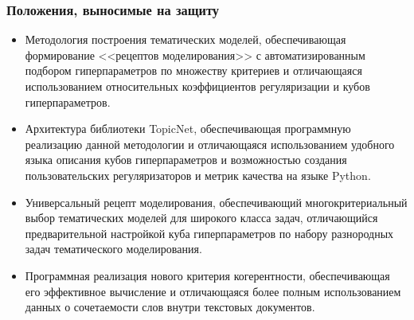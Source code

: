 \begin{frame}
    \frametitle{Положения, выносимые на защиту}
\small
    \begin{itemize}
\item
    Методология построения тематических моделей, обеспечивающая формирование <<рецептов моделирования>> с автоматизированным подбором гиперпараметров по множеству критериев и отличающаяся использованием относительных коэффициентов регуляризации и кубов гиперпараметров.
\item
    Архитектура библиотеки TopicNet, обеспечивающая программную реализацию данной методологии и отличающаяся использованием удобного языка описания кубов гиперпараметров и возможностью создания пользовательских регуляризаторов и метрик качества на языке Python.
\item
    Универсальный рецепт моделирования, обеспечивающий многокритериальный выбор тематических моделей для широкого класса задач, отличающийся предварительной настройкой куба гиперпараметров по набору разнородных задач тематического моделирования.
\item
    Программная реализация нового критерия когерентности, обеспечивающая его эффективное вычисление и отличающаяся более полным использованием данных о сочетаемости слов внутри текстовых документов.
    \end{itemize}

    
\end{frame}


